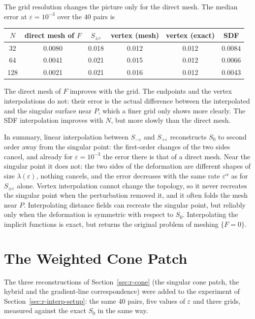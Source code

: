 \documentclass[12pt, a4paper, oneside]{book}
\theoremstyle{plain}
\theoremstyle{definition}
\theoremstyle{remark}
\theoremstyle{definition}
\begin{document}
The grid resolution changes the picture only for the direct mesh. The median error at $\varepsilon=10^{-3}$ over the $40$ pairs is
\begin{center}
\small
\begin{tabular}{c c c c c c}
\toprule
$N$ & direct mesh of $F$ & $S_{\pm\varepsilon}$ & vertex (mesh) & vertex (exact) & SDF \\
\midrule
32  & 0.0080 & 0.018 & 0.012 & 0.012 & 0.0084 \\
64  & 0.0041 & 0.021 & 0.015 & 0.012 & 0.0066 \\
128 & 0.0021 & 0.021 & 0.016 & 0.012 & 0.0043 \\
\bottomrule
\end{tabular}
\end{center}
The direct mesh of $F$ improves with the grid. The endpoints and the vertex interpolations do not: their error is the actual difference between the interpolated and the singular surface near $P$, which a finer grid only shows more clearly. The SDF interpolation improves with $N$, but more slowly than the direct mesh.

In summary, linear interpolation between $S_{-\varepsilon}$ and $S_{+\varepsilon}$ reconstructs $S_0$ to second order away from the singular point: the first-order changes of the two sides cancel, and already for $\varepsilon=10^{-3}$ the error there is that of a direct mesh. Near the singular point it does not: the two sides of the deformation are different shapes of size $\lambda(\varepsilon)$, nothing cancels, and the error decreases with the same rate $\varepsilon^\alpha$ as for $S_{\pm\varepsilon}$ alone. Vertex interpolation cannot change the topology, so it never recreates the singular point when the perturbation removed it, and it often folds the mesh near $P$. Interpolating distance fields can recreate the singular point, but reliably only when the deformation is symmetric with respect to $S_0$. Interpolating the implicit functions is exact, but returns the original problem of meshing $\{F=0\}$.

\section{The Weighted Cone Patch}
\label{sec:r-cone-results}

The three reconstructions of Section~\ref{sec:r-cone} (the singular cone patch, the hybrid and the gradient-line correspondence) were added to the experiment of Section~\ref{sec:r-interp-setup}: the same $40$ pairs, five values of $\varepsilon$ and three grids, measured against the exact $S_0$ in the same way.
\end{document}

